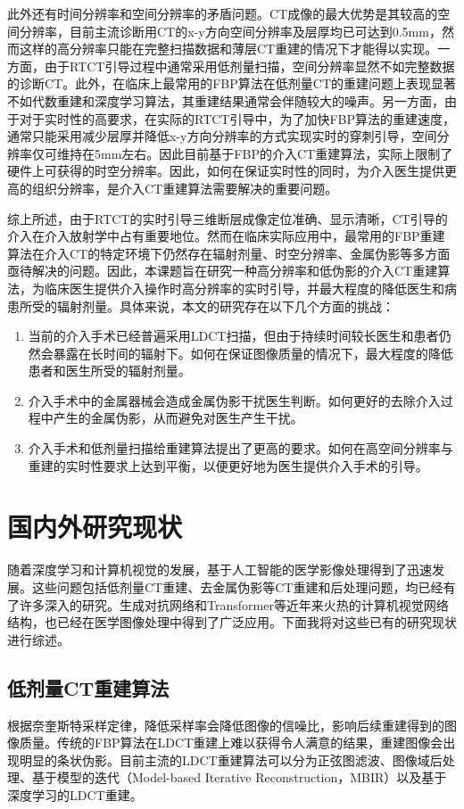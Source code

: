 此外还有时间分辨率和空间分辨率的矛盾问题。CT成像的最大优势是其较高的空间分辨率，目前主流诊断用CT的x-y方向空间分辨率及层厚均已可达到0.5mm，然而这样的高分辨率只能在完整扫描数据和薄层CT重建的情况下才能得以实现。一方面，由于RTCT引导过程中通常采用低剂量扫描，空间分辨率显然不如完整数据的诊断CT。此外，在临床上最常用的FBP算法在低剂量CT的重建问题上表现显著不如代数重建和深度学习算法，其重建结果通常会伴随较大的噪声。另一方面，由于对于实时性的高要求，在实际的RTCT引导中，为了加快FBP算法的重建速度，通常只能采用减少层厚并降低x-y方向分辨率的方式实现实时的穿刺引导，空间分辨率仅可维持在5mm左右。因此目前基于FBP的介入CT重建算法，实际上限制了硬件上可获得的时空分辨率。因此，如何在保证实时性的同时，为介入医生提供更高的组织分辨率，是介入CT重建算法需要解决的重要问题。

综上所述，由于RTCT的实时引导三维断层成像定位准确、显示清晰，CT引导的介入在介入放射学中占有重要地位。然而在临床实际应用中，最常用的FBP重建算法在介入CT的特定环境下仍然存在辐射剂量、时空分辨率、金属伪影等多方面亟待解决的问题。因此，本课题旨在研究一种高分辨率和低伪影的介入CT重建算法，为临床医生提供介入操作时高分辨率的实时引导，并最大程度的降低医生和病患所受的辐射剂量。具体来说，本文的研究存在以下几个方面的挑战：
\begin{enumerate}
  \item 当前的介入手术已经普遍采用LDCT扫描，但由于持续时间较长医生和患者仍然会暴露在长时间的辐射下。如何在保证图像质量的情况下，最大程度的降低患者和医生所受的辐射剂量。
  \item 介入手术中的金属器械会造成金属伪影干扰医生判断。如何更好的去除介入过程中产生的金属伪影，从而避免对医生产生干扰。
  \item 介入手术和低剂量扫描给重建算法提出了更高的要求。如何在高空间分辨率与重建的实时性要求上达到平衡，以便更好地为医生提供介入手术的引导。
\end{enumerate}

\section{国内外研究现状}
随着深度学习和计算机视觉的发展，基于人工智能的医学影像处理得到了迅速发展。这些问题包括低剂量CT重建、去金属伪影等CT重建和后处理问题，均已经有了许多深入的研究。生成对抗网络\cite{goodfellowGenerativeAdversarialNets2014}和Transformer\cite{vaswaniAttentionAllYou2017}等近年来火热的计算机视觉网络结构，也已经在医学图像处理中得到了广泛应用。下面我将对这些已有的研究现状进行综述。

\subsection{低剂量CT重建算法}
根据奈奎斯特采样定律，降低采样率会降低图像的信噪比，影响后续重建得到的图像质量。传统的FBP算法在LDCT重建上难以获得令人满意的结果，重建图像会出现明显的条状伪影。目前主流的LDCT重建算法可以分为正弦图滤波、图像域后处理、基于模型的迭代（Model-based Iterative Reconstruction，MBIR）以及基于深度学习的LDCT重建。


